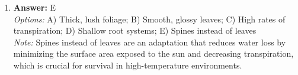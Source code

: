 \documentclass[12pt]{article}
\begin{document}
\begin{enumerate}[label=\arabic*.]
\\ \textit{Note:} Animals utilize a combination of sensory cues, including taste to detect environmental changes, wind direction for navigation, and humidity to assess weather conditions, all of which are crucial for successful migration.
\item \textbf{Answer:} E
\\ \textit{Options:} A) Thick, lush foliage; B) Smooth, glossy leaves; C) High rates of transpiration; D) Shallow root systems; E) Spines instead of leaves
\\ \textit{Note:} Spines instead of leaves are an adaptation that reduces water loss by minimizing the surface area exposed to the sun and decreasing transpiration, which is crucial for survival in high-temperature environments.
\end{enumerate}
\end{document}
